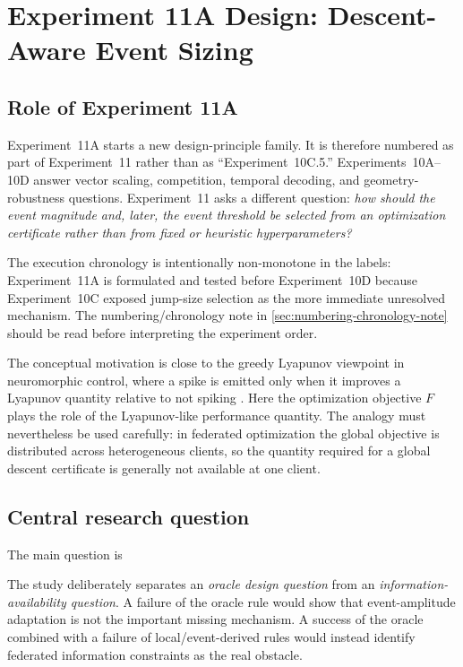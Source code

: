 \section{Experiment 11A Design: Descent-Aware Event Sizing}
\label{sec:exp11a-design}

\subsection{Role of Experiment 11A}

Experiment~11A starts a new design-principle family. It is therefore numbered as part of Experiment~11 rather than as ``Experiment~10C.5.'' Experiments~10A--10D answer vector scaling, competition, temporal decoding, and geometry-robustness questions. Experiment~11 asks a different question: \emph{how should the event magnitude and, later, the event threshold be selected from an optimization certificate rather than from fixed or heuristic hyperparameters?}

The execution chronology is intentionally non-monotone in the labels: Experiment~11A is formulated and tested before Experiment~10D because Experiment~10C exposed jump-size selection as the more immediate unresolved mechanism. The numbering/chronology note in \cref{sec:numbering-chronology-note} should be read before interpreting the experiment order.

The conceptual motivation is close to the greedy Lyapunov viewpoint in neuromorphic control, where a spike is emitted only when it improves a Lyapunov quantity relative to not spiking \cite{heemels2026greedy}. Here the optimization objective $F$ plays the role of the Lyapunov-like performance quantity. The analogy must nevertheless be used carefully: in federated optimization the global objective is distributed across heterogeneous clients, so the quantity required for a global descent certificate is generally not available at one client.

\subsection{Central research question}

The main question is
\begin{center}
\end{center}
The study deliberately separates an \emph{oracle design question} from an \emph{information-availability question}. A failure of the oracle rule would show that event-amplitude adaptation is not the important missing mechanism. A success of the oracle combined with a failure of local/event-derived rules would instead identify federated information constraints as the real obstacle.

